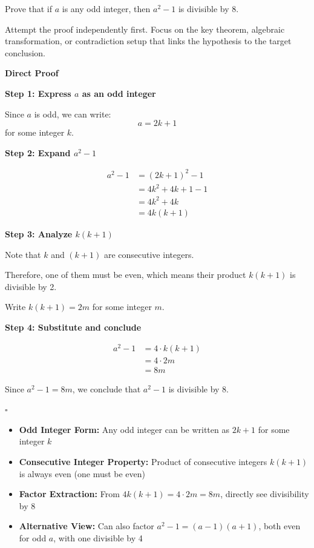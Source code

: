
\begin{problem}
Prove that if $a$ is any odd integer, then $a^2 - 1$ is divisible by 8.
\end{problem}

\begin{hint}
Attempt the proof independently first. Focus on the key theorem, algebraic transformation, or contradiction setup that links the hypothesis to the target conclusion.
\end{hint}

\begin{solution}
\textbf{Direct Proof}

\textbf{Step 1: Express $a$ as an odd integer}

Since $a$ is odd, we can write:
\[ a = 2k + 1 \]
for some integer $k$.

\textbf{Step 2: Expand $a^2 - 1$}

\begin{align*}
    a^2 - 1 &= (2k + 1)^2 - 1 \\
    &= 4k^2 + 4k + 1 - 1 \\
    &= 4k^2 + 4k \\
    &= 4k(k + 1)
\end{align*}

\textbf{Step 3: Analyze $k(k+1)$}

Note that $k$ and $(k+1)$ are consecutive integers. 

Therefore, one of them must be even, which means their product $k(k+1)$ is divisible by 2.

Write $k(k+1) = 2m$ for some integer $m$.

\textbf{Step 4: Substitute and conclude}

\begin{align*}
    a^2 - 1 &= 4 \cdot k(k+1) \\
    &= 4 \cdot 2m \\
    &= 8m
\end{align*}

Since $a^2 - 1 = 8m$, we conclude that $a^2 - 1$ is divisible by 8.

\hfill $\square$
\end{solution}

\begin{takeaways}
\begin{itemize}
\item \textbf{Odd Integer Form:} Any odd integer can be written as $2k+1$ for some integer $k$
\item \textbf{Consecutive Integer Property:} Product of consecutive integers $k(k+1)$ is always even (one must be even)
\item \textbf{Factor Extraction:} From $4k(k+1) = 4 \cdot 2m = 8m$, directly see divisibility by 8
\item \textbf{Alternative View:} Can also factor $a^2-1 = (a-1)(a+1)$, both even for odd $a$, with one divisible by 4
\end{itemize}
\end{takeaways}
